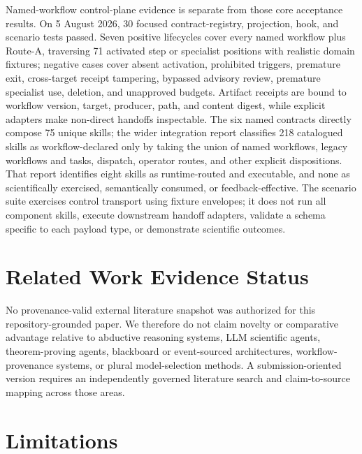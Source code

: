 \documentclass[11pt]{article}
\begin{document}
Named-workflow control-plane evidence is separate from those core acceptance results. On 5 August 2026, 30 focused contract-registry, projection, hook, and scenario tests passed. Seven positive lifecycles cover every named workflow plus Route-A, traversing 71 activated step or specialist positions with realistic domain fixtures; negative cases cover absent activation, prohibited triggers, premature exit, cross-target receipt tampering, bypassed advisory review, premature specialist use, deletion, and unapproved budgets. Artifact receipts are bound to workflow version, target, producer, path, and content digest, while explicit adapters make non-direct handoffs inspectable. The six named contracts directly compose 75 unique skills; the wider integration report classifies 218 catalogued skills as workflow-declared only by taking the union of named workflows, legacy workflows and tasks, dispatch, operator routes, and other explicit dispositions. That report identifies eight skills as runtime-routed and executable, and none as scientifically exercised, semantically consumed, or feedback-effective. The scenario suite exercises control transport using fixture envelopes; it does not run all component skills, execute downstream handoff adapters, validate a schema specific to each payload type, or demonstrate scientific outcomes.

\section{Related Work Evidence Status}

No provenance-valid external literature snapshot was authorized for this repository-grounded paper. We therefore do not claim novelty or comparative advantage relative to abductive reasoning systems, LLM scientific agents, theorem-proving agents, blackboard or event-sourced architectures, workflow-provenance systems, or plural model-selection methods. A submission-oriented version requires an independently governed literature search and claim-to-source mapping across those areas.

\section{Limitations}
\end{document}
